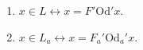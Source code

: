 \begin{enumerate}
\item $x \in L \leftrightarrow x = F'\mathrm{Od}'x$.
\item $x \in L_a \leftrightarrow x = F_a'\mathrm{Od}_a'x$.
\end{enumerate}
